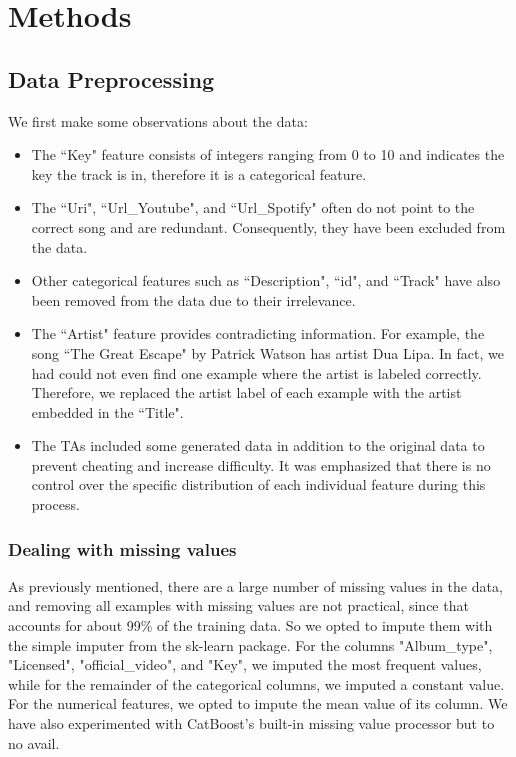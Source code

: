 \documentclass{article}
\begin{document}
\section{Methods}
\subsection{Data Preprocessing}
We first make some observations about the data:
\begin{itemize}
    \item The ``Key" feature consists of integers ranging from 0 to 10 and indicates the key the track is in, therefore it is a categorical feature.
    \item The ``Uri", ``Url\_Youtube", and ``Url\_Spotify" often do not point to the correct song and are redundant. Consequently, they have been excluded from the data.
    \item Other categorical features such as ``Description", ``id", and ``Track" have also been removed from the data due to their irrelevance.
    \item The ``Artist" feature provides contradicting information. For example, the song ``The Great Escape" by Patrick Watson has artist Dua Lipa. In fact, we had could not even find one example where the artist is labeled correctly. Therefore, we replaced the artist label of each example with the artist embedded in the ``Title".
    \item The TAs included some generated data in addition to the original data to prevent cheating and increase difficulty. It was emphasized that there is no control over the specific distribution of each individual feature during this process.
\end{itemize}
\subsubsection{Dealing with missing values}
As previously mentioned, there are a large number of missing values in the data, and removing all examples with missing values are not practical, since that accounts for about 99\% of the training data. So we opted to impute them with the simple imputer from the sk-learn package\cite{scikit-learn}. For the columns "Album\_type", "Licensed", "official\_video", and "Key", we imputed the most frequent values, while for the remainder of the categorical columns, we imputed a constant value. For the numerical features, we opted to impute the mean value of its column. We have also experimented with CatBoost's built-in missing value processor but to no avail.
\end{document}
